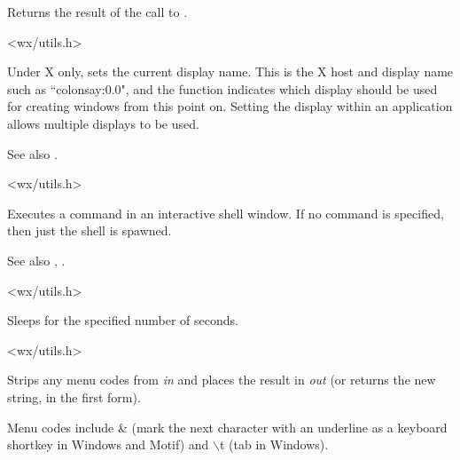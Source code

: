 Returns the result of the call to .


<wx/utils.h>

\label{wxsetdisplayname}


Under X only, sets the current display name. This is the X host and display name such
as ``colonsay:0.0", and the function indicates which display should be used for creating
windows from this point on. Setting the display within an application allows multiple
displays to be used.

See also .


<wx/utils.h>

\label{wxshell}


Executes a command in an interactive shell window. If no command is
specified, then just the shell is spawned.

See also , .


<wx/utils.h>

\label{wxsleep}


Sleeps for the specified number of seconds.


<wx/utils.h>




Strips any menu codes from {\it in} and places the result
in {\it out} (or returns the new string, in the first form).

Menu codes include \& (mark the next character with an underline
as a keyboard shortkey in Windows and Motif) and $\backslash$t (tab in Windows).


